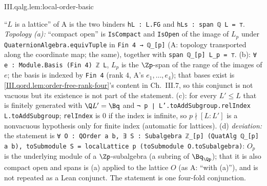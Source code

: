 \begin{lemma}
\end{lemma}
\begin{tfformal}{III.qalg.lem:local-order-basic}
\begin{tffidelity}
``$L$ is a lattice'' of A is the two binders \texttt{hL : L.FG} and \texttt{hLs : span ℚ L = ⊤}. \emph{Topology (a):} ``compact open'' is \texttt{IsCompact} and \texttt{IsOpen} of the image of $L_p$ under \texttt{QuaternionAlgebra.equivTuple} in \texttt{Fin 4 → ℚ\_[p]} (A: topology transported along the coordinate map; the same), together with \texttt{span ℚ\_[p] L\_p = ⊤}. (b): \texttt{∀ e : Module.Basis (Fin 4) ℤ L}, $L_p$ is the $\Zp$-span of the range of the images of $e$; the basis is indexed by \texttt{Fin 4} (rank $4$, A's $e_1,\dots,e_4$); that bases exist is \cref{III.qord.lem:order-free-rank-four}'s content in Ch.~III.7, so this conjunct is not vacuous but its existence is not part of the statement. (c): for every $L'\le L$ that is finitely generated with $\Q L'=\Bq$ and \texttt{¬ p ∣ L'.toAddSubgroup.relIndex L.toAddSubgroup}; \texttt{relIndex} is $0$ if the index is infinite, so $p\nmid[L:L']$ is a nonvacuous hypothesis only for finite index (automatic for lattices). (d) \emph{deviation:} the statement is \texttt{∀ O : QOrder a b, ∃ S : Subalgebra ℤ\_[p] (QuatAlg ℚ\_[p] a b), toSubmodule S = localLattice p (toSubmodule O.toSubalgebra)}: $O_p$ is the underlying module of a $\Zp$-subalgebra (a subring of $\Bq_{\Qp}$); that it is also compact open and spans is (a) applied to the lattice $O$ (as A: ``with (a)''), and is not repeated as a Lean conjunct. The statement is one four-fold conjunction.
\end{tffidelity}
\end{tfformal}
